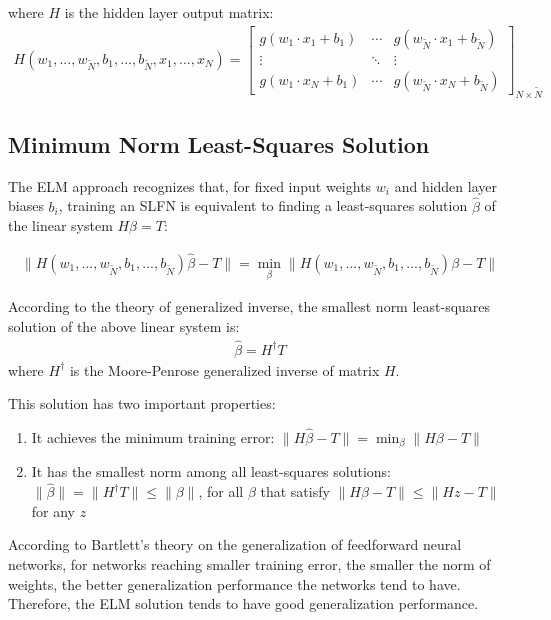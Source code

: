 \documentclass[11pt]{article}
\begin{document}
where $H$ is the hidden layer output matrix:
\begin{align}
H(w_1,...,w_{\tilde{N}},b_1,...,b_{\tilde{N}},x_1,...,x_N) = 
\begin{bmatrix}
g(w_1 \cdot x_1 + b_1) & \cdots & g(w_{\tilde{N}} \cdot x_1 + b_{\tilde{N}}) \\
\vdots & \ddots & \vdots \\
g(w_1 \cdot x_N + b_1) & \cdots & g(w_{\tilde{N}} \cdot x_N + b_{\tilde{N}})
\end{bmatrix}_{N \times \tilde{N}}
\end{align}

\subsection{Minimum Norm Least-Squares Solution}

The ELM approach recognizes that, for fixed input weights $w_i$ and hidden layer biases $b_i$, training an SLFN is equivalent to finding a least-squares solution $\hat{\beta}$ of the linear system $H\beta = T$:

\begin{align}
\|H(w_1,...,w_{\tilde{N}},b_1,...,b_{\tilde{N}})\hat{\beta} - T\| = \min_{\beta}\|H(w_1,...,w_{\tilde{N}},b_1,...,b_{\tilde{N}})\beta - T\|
\end{align}

According to the theory of generalized inverse, the smallest norm least-squares solution of the above linear system is:
\begin{align}
\hat{\beta} = H^{\dagger}T
\end{align}
where $H^{\dagger}$ is the Moore-Penrose generalized inverse of matrix $H$.

This solution has two important properties:
\begin{enumerate}
    \item It achieves the minimum training error: $\|H\hat{\beta} - T\| = \min_{\beta}\|H\beta - T\|$
    \item It has the smallest norm among all least-squares solutions: $\|\hat{\beta}\| = \|H^{\dagger}T\| \leq \|\beta\|$, for all $\beta$ that satisfy $\|H\beta - T\| \leq \|Hz - T\|$ for any $z$
\end{enumerate}

According to Bartlett's theory on the generalization of feedforward neural networks, for networks reaching smaller training error, the smaller the norm of weights, the better generalization performance the networks tend to have. Therefore, the ELM solution tends to have good generalization performance.
\end{document}
